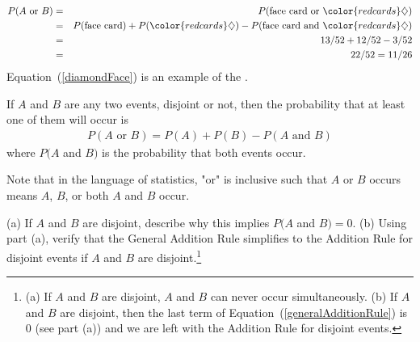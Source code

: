 \begin{eqnarray}
P(A\text{ or } B) &=&P(\text{face card or }{\color{redcards}\diamondsuit})  \notag \\
 &=& P(\text{face card}) + P({\color{redcards}\diamondsuit}) - P(\text{face card and }{\color{redcards}\diamondsuit}) \label{diamondFace} \\
 &=& 13/52 + 12/52 - 3/52 \notag \\
 &=& 22/52 = 11/26 \notag
\end{eqnarray}
Equation~(\ref{diamondFace}) is an example of the . 

\begin{termBox}{ If $A$ and $B$ are any two events, disjoint or not, then the probability that at least one of them will occur is
\begin{eqnarray}
P(A\text{ or }B) = P(A) + P(B) - P(A\text{ and }B)
\label{generalAdditionRule}
\end{eqnarray}
where $P(A$ and $B)$ is the probability that both events occur.}
\end{termBox}

Note that in the language of statistics, "or" is inclusive such that $A$ or $B$ occurs means $A$, $B$, or both $A$ and $B$ occur.

\begin{exercise}
(a) If $A$ and $B$ are disjoint, describe why this implies $P(A$ and $B) = 0$. (b) Using part (a), verify that the General Addition Rule simplifies to the Addition Rule for disjoint events if $A$ and $B$ are disjoint.\footnote{(a) If $A$ and $B$ are disjoint, $A$ and $B$ can never occur simultaneously. (b) If $A$ and $B$ are disjoint, then the last term of Equation~(\ref{generalAdditionRule}) is 0 (see part (a)) and we are left with the Addition Rule for disjoint events.}
\end{exercise}

